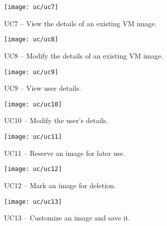 \begin{figure}[h]
  \begin{center}
    \leavevmode
    \texttt{[image: uc/uc7]}
    \caption{UC7 -- View the details of an existing VM image.}
    \label{fig:uc7}
  \end{center}
\end{figure}

\begin{figure}[h]
  \begin{center}
    \leavevmode
    \texttt{[image: uc/uc8]}
    \caption{UC8 -- Modify the details of an existing VM image.}
    \label{fig:uc8}
  \end{center}
\end{figure}

\begin{figure}[h]
  \begin{center}
    \leavevmode
    \texttt{[image: uc/uc9]}
    \caption{UC9 -- View user details.}
    \label{fig:uc9}
  \end{center}
\end{figure}

\begin{figure}[h]
  \begin{center}
    \leavevmode
    \texttt{[image: uc/uc10]}
    \caption{UC10 -- Modify the user's details.}
    \label{fig:uc10}
  \end{center}
\end{figure}

\begin{figure}[h]
  \begin{center}
    \leavevmode
    \texttt{[image: uc/uc11]}
    \caption{UC11 -- Reserve an image for later use.}
    \label{fig:uc11}
  \end{center}
\end{figure}

\begin{figure}[h]
  \begin{center}
    \leavevmode
    \texttt{[image: uc/uc12]}
    \caption{UC12 -- Mark an image for deletion.}
    \label{fig:uc12}
  \end{center}
\end{figure}

\begin{figure}[h]
  \begin{center}
    \leavevmode
    \texttt{[image: uc/uc13]}
    \caption{UC13 -- Customize an image and save it.}
    \label{fig:uc13}
  \end{center}
\end{figure}
